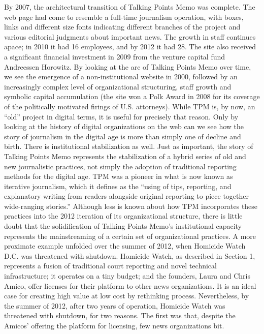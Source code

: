 By 2007, the architectural transition of Talking Points Memo was complete. The
web page had come to resemble a full-time journalism operation, with boxes,
links and different size fonts indicating different branches of the project and
various editorial judgments about important news. The growth in staff continues
apace; in 2010 it had 16 employees, and by 2012 it had 28. The site also received
a significant financial investment in 2009 from the venture capital fund Andreessen
Horowitz.
By looking at the arc of Talking Points Memo over time, we see the emergence
of a non-institutional website in 2000, followed by an increasingly complex level
of organizational structuring, staff growth and symbolic capital accumulation (the
site won a Polk Award in 2008 for its coverage of the politically motivated firings
of U.S. attorneys). While TPM is, by now, an ``old'' project in digital terms, it is useful
for precisely that reason. Only by looking at the history of digital organizations
on the web can we see how the story of journalism in the digital age is more than
simply one of decline and birth. There is institutional stabilization as well.
Just as important, the story of Talking Points Memo represents the stabilization
of a hybrid series of old and new journalistic practices, not simply the adoption
of traditional reporting methods for the digital age. TPM was a pioneer in
what is now known as iterative journalism, which it defines as the ``using of tips,
reporting, and explanatory writing from readers alongside original reporting to
piece together wide-ranging stories.'' Although less is known about how TPM
incorporates these practices into the 2012 iteration of its organizational structure,
there is little doubt that the solidification of Talking Points Memo’s institutional
capacity represents the mainstreaming of a certain set of organizational practices.
A more proximate example unfolded over the summer of 2012, when Homicide
Watch D.C. was threatened with shutdown. Homicide Watch, as described in
Section 1, represents a fusion of traditional court reporting and novel technical
infrastructure; it operates on a tiny budget; and the founders, Laura and Chris
Amico, offer licenses for their platform to other news organizations. It is an ideal
case for creating high value at low cost by rethinking process.
Nevertheless, by the summer of 2012, after two years of operation, Homicide
Watch was threatened with shutdown, for two reasons. The first was that, despite
the Amicos’ offering the platform for licensing, few news organizations bit.

